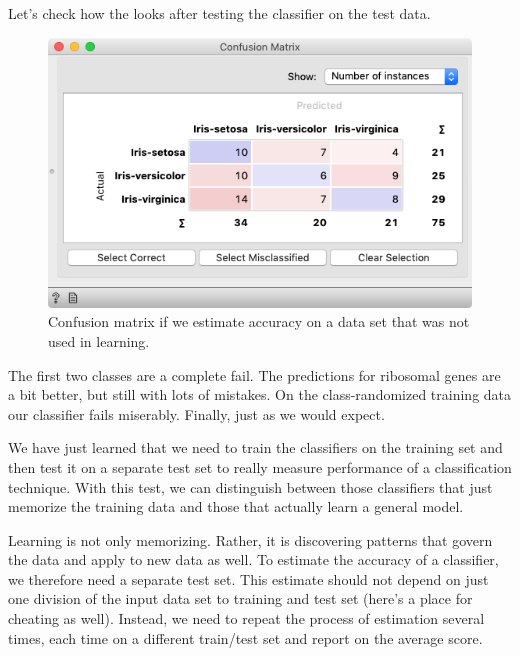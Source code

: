 Let’s check how the  looks after testing the classifier on the test data.

\begin{figure}[h]
    \includegraphics[scale=0.35]{graphics/ch-how_to_cheat/confusion_sampler.png}
    \caption{Confusion matrix if we estimate accuracy on a data set that was not used in learning.}
\end{figure}

The first two classes are a complete fail. The predictions for ribosomal genes are a bit better, but still with lots of mistakes. On the class-randomized training data our classifier fails miserably. Finally, just as we would expect.

We have just learned that we need to train the classifiers on the training set and then test it on a separate test set to really measure performance of a classification technique. With this test, we can distinguish between those classifiers that just memorize the training data and those that actually learn a general model.

Learning is not only memorizing. Rather, it is discovering patterns that govern the data and apply to new data as well. To estimate the accuracy of a classifier, we therefore need a separate test set. This estimate should not depend on just one division of the input data set to training and test set (here’s a place for cheating as well). Instead, we need to repeat the process of estimation several times, each time on a different train/test set and report on the average score.